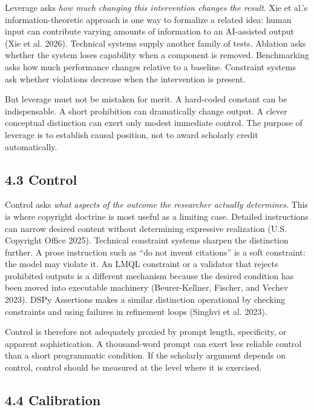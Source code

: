 \documentclass[
]{article}
\begin{document}
Leverage asks \emph{how much changing this intervention changes the
result}. Xie et al.'s information-theoretic approach is one way to
formalize a related idea: human input can contribute varying amounts of
information to an AI-assisted output (Xie et al. 2026). Technical
systems supply another family of tests. Ablation asks whether the system
loses capability when a component is removed. Benchmarking asks how much
performance changes relative to a baseline. Constraint systems ask
whether violations decrease when the intervention is present.

But leverage must not be mistaken for merit. A hard-coded constant can
be indispensable. A short prohibition can dramatically change output. A
clever conceptual distinction can exert only modest immediate control.
The purpose of leverage is to establish causal position, not to award
scholarly credit automatically.

\subsection{4.3 Control}\label{control}

Control asks \emph{what aspects of the outcome the researcher actually
determines}. This is where copyright doctrine is most useful as a
limiting case. Detailed instructions can narrow desired content without
determining expressive realization (U.S. Copyright Office 2025).
Technical constraint systems sharpen the distinction further. A prose
instruction such as ``do not invent citations'' is a soft constraint:
the model may violate it. An LMQL constraint or a validator that rejects
prohibited outputs is a different mechanism because the desired
condition has been moved into executable machinery (Beurer-Kellner,
Fischer, and Vechev 2023). DSPy Assertions makes a similar distinction
operational by checking constraints and using failures in refinement
loops (Singhvi et al. 2023).

Control is therefore not adequately proxied by prompt length,
specificity, or apparent sophistication. A thousand-word prompt can
exert less reliable control than a short programmatic condition. If the
scholarly argument depends on control, control should be measured at the
level where it is exercised.

\subsection{4.4 Calibration}\label{calibration}
\end{document}
